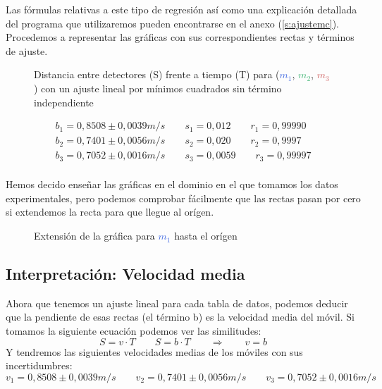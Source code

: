\documentclass[12pt, a4paper, titlepage]{article}
\begin{document}
  Las fórmulas relativas a este tipo de regresión así como una explicación detallada del programa que utilizaremos pueden encontrarse en el anexo (\ref{s:ajustemc}). Procedemos a representar las gráficas con sus correspondientes rectas y términos de ajuste.

  \begin{figure}[H]
    \centering
     
    
    \caption{Distancia entre detectores (S) frente a tiempo (T) para  (\textcolor{RoyalBlue}{$m_1$}, \textcolor{MediumSeaGreen}{$m_2$}, \textcolor{IndianRed}{$m_3$}) con un ajuste lineal por mínimos cuadrados sin término independiente}
  \end{figure}
  \begin{gather*}
    b_1 = 0,8508 \pm 0,0039 m/s \qquad s_1 = 0,012 \qquad r_1 = 0,99990 \\
    b_2 = 0,7401 \pm 0,0056 m/s \qquad s_2 = 0,020 \qquad r_2 = 0,9997 \\
    b_3 = 0,7052 \pm 0,0016 m/s \qquad s_3 = 0,0059 \qquad r_3 = 0,99997 \\
  \end{gather*}

  Hemos decido enseñar las gráficas en el dominio en el que tomamos los datos experimentales, pero podemos comprobar fácilmente que las rectas pasan por cero si extendemos la recta para que llegue al orígen.

  \begin{figure}[H]
    \hspace{3.5em} 
    \caption{Extensión de la gráfica para \textcolor{RoyalBlue}{$m_1$} hasta el orígen}
  \end{figure}

  \subsection{Interpretación: Velocidad media}

  Ahora que tenemos un ajuste lineal para cada tabla de datos, podemos deducir que la pendiente de esas rectas (el término b) es la velocidad media del móvil. Si tomamos la siguiente ecuación podemos ver las similitudes:
  \begin{equation}
    S = v \cdot T \qquad S = b \cdot T \qquad \Rightarrow  \qquad v = b
  \end{equation}
  Y tendremos las siguientes velocidades medias de los móviles con sus incertidumbres:
  \begin{equation*}
    v_1 = 0,8508 \pm 0,0039 m/s \qquad v_2 = 0,7401 \pm 0,0056 m/s \qquad v_3 = 0,7052 \pm 0,0016 m/s
  \end{equation*}
\end{document}
